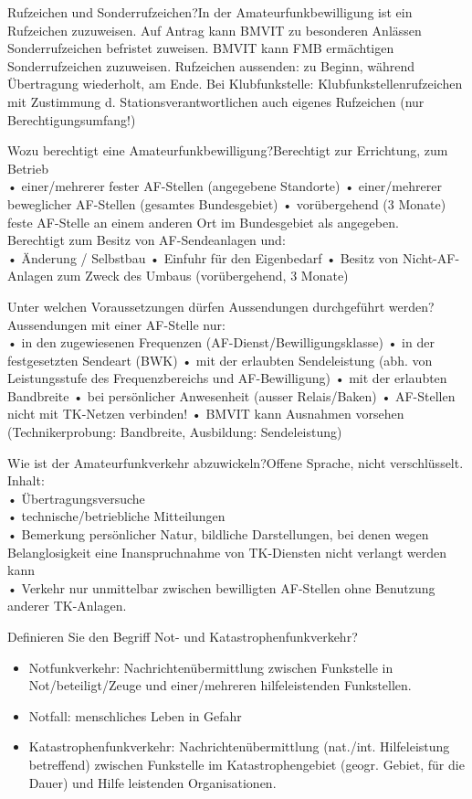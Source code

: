 \documentclass[avery5371,grid,frame,a4paper]{flashcards}
\newcommand{\card}[3]{
  \begin{flashcard}[{\chap} -- #1]{#2}#3\end{flashcard}
}
\begin{document}
\card{28}{Rufzeichen und Sonderrufzeichen?}{In der Amateurfunkbewilligung ist ein Rufzeichen zuzuweisen. Auf Antrag kann BMVIT zu besonderen Anlässen Sonderrufzeichen befristet zuweisen. BMVIT kann FMB ermächtigen Sonderrufzeichen zuzuweisen. Rufzeichen aussenden: zu Beginn, während Übertragung wiederholt, am Ende. Bei Klubfunkstelle: Klubfunkstellenrufzeichen mit Zustimmung d. Stationsverantwortlichen auch eigenes Rufzeichen (nur Berechtigungsumfang!)}

\card{29}{Wozu berechtigt eine Amateurfunkbewilligung?}{Berechtigt zur Errichtung, zum Betrieb \\
• einer/mehrerer fester AF-Stellen (angegebene Standorte)
• einer/mehrerer beweglicher AF-Stellen (gesamtes Bundesgebiet)
• vorübergehend (3 Monate) feste AF-Stelle an einem anderen Ort im Bundesgebiet als angegeben. \\
Berechtigt zum Besitz von AF-Sendeanlagen und: \\
• Änderung / Selbstbau
• Einfuhr für den Eigenbedarf
• Besitz von Nicht-AF-Anlagen zum Zweck des Umbaus (vorübergehend, 3 Monate)}

\card{30}{Unter welchen Voraussetzungen dürfen Aussendungen durchgeführt werden?}{Aussendungen mit einer AF-Stelle nur: \\
• in den zugewiesenen Frequenzen (AF-Dienst/Bewilligungsklasse)
• in der festgesetzten Sendeart (BWK)
• mit der erlaubten Sendeleistung (abh. von Leistungsstufe des Frequenzbereichs und AF-Bewilligung)
• mit der erlaubten Bandbreite
• bei persönlicher Anwesenheit (ausser Relais/Baken)
• AF-Stellen nicht mit TK-Netzen verbinden!
• BMVIT kann Ausnahmen vorsehen (Technikerprobung: Bandbreite, Ausbildung: Sendeleistung)}

\card{31}{Wie ist der Amateurfunkverkehr abzuwickeln?}{Offene Sprache, nicht verschlüsselt.
Inhalt:\\ • Übertragungsversuche \\ • technische/betriebliche Mitteilungen \\ • Bemerkung persönlicher Natur, bildliche Darstellungen, bei denen wegen Belanglosigkeit eine Inanspruchnahme von TK-Diensten nicht verlangt werden kann \\ • Verkehr nur unmittelbar zwischen bewilligten AF-Stellen ohne Benutzung anderer TK-Anlagen.}

\card{32}{Definieren Sie den Begriff Not- und Katastrophenfunkverkehr?}{\begin{itemize}\itemsep0pt \item Notfunkverkehr: Nachrichtenübermittlung zwischen Funkstelle in Not/beteiligt/Zeuge und einer/mehreren hilfeleistenden Funkstellen. \item Notfall: menschliches Leben in Gefahr \item Katastrophenfunkverkehr: Nachrichtenübermittlung (nat./int. Hilfeleistung betreffend) zwischen Funkstelle im Katastrophengebiet (geogr. Gebiet, für die Dauer) und Hilfe leistenden Organisationen.\end{itemize}}
\end{document}
